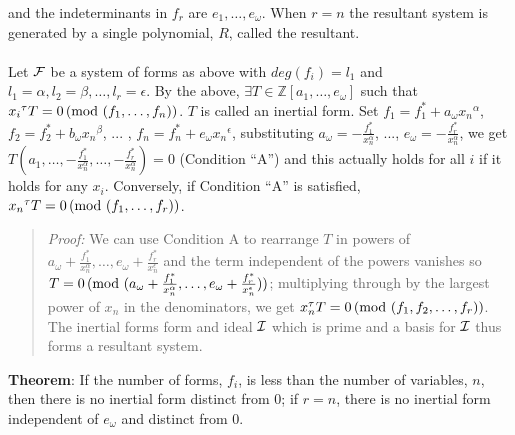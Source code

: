 and the indeterminants in $f_r$ are $e_1, \ldots , e_{\omega}$.  
When $r=n$ the resultant system is generated by a single polynomial, $R$, called the
resultant.
\\
\\
Let ${\cal F}$ be a system of forms as above with
$deg(f_i)=l_1$ and $l_1=\alpha, l_2= \beta, \ldots, l_r= \epsilon$.  
By the above, $\exists T \in {\mathbb Z}[a_1, \ldots , e_{\omega}]$ such
that ${x_i}^{\tau} T = 0 \thinspace \textnormal{(mod } (f_1, \ldots, f_n) \textnormal{)}$. $T$ is called an inertial form.
Set $f_1= f_1^* + a_{\omega}{x_n}^{\alpha}$,
$f_2= f_2^* + b_{\omega}{x_n}^{\beta}$, ... ,
$f_n= f_n^* + e_{\omega}{x_n}^{\epsilon}$, substituting
$a_{\omega}= -{\frac {f_1^*} {x_n^{\alpha}}}$, ...,
$e_{\omega}= -{\frac {f_r^*} {x_n^{\alpha}}}$, we get
$T(a_1 , \ldots, -{\frac {f_1^*} {x_n^{\alpha}}}, \ldots, 
-{\frac {f_r^*} {x_n^{\alpha}}}) =0$
(Condition ``A'')
and this actually holds for all $i$ if it holds for any $x_i$.  Conversely, if
Condition ``A'' is satisfied, ${x_n}^{\tau} T=0 \thinspace \textnormal{(mod } (f_1, \ldots, f_r) \textnormal{)}$.  
\begin{quote}
\emph{Proof:}
We can use Condition A to rearrange $T$ in powers of
$a_{\omega}+{\frac {f^*_1} {x_n^{\alpha}}}, 
\ldots, e_{\omega}+{\frac {f^*_r} {x_n^{\epsilon}}}$ and the term independent of the
powers vanishes so 
$T= 0
\thinspace \textnormal{(mod } (a_{\omega}+{\frac {f^*_1} {x_n^{\alpha}}},
\ldots, e_{\omega}+{\frac {f^*_r} {x_n^{\epsilon}}}) \textnormal{)}$; multiplying through by the largest
power of $x_n$ in the denominators, we get 
$x_n^{\tau}T= 0 \thinspace \textnormal{(mod } (f_1, f_2 , \ldots , f_r) \textnormal{)}$.
The inertial forms form and ideal ${\cal I}$ which is prime and a basis for ${\cal I}$
thus forms a resultant system.
\end{quote}
{\bf Theorem}:  If the number
of forms, $f_i$, is less than the number of variables, $n$, then there is no inertial form
distinct from $0$; if $r=n$, there is no inertial form independent of $e_{\omega}$ and
distinct from $0$.  
